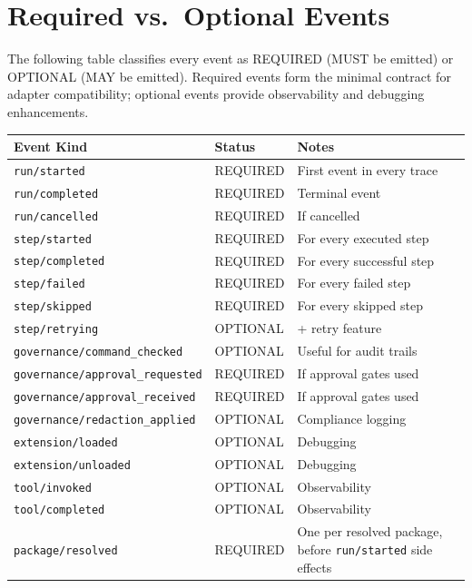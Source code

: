 \section{Required vs.\ Optional Events}

The following table classifies every event as REQUIRED (MUST be emitted) or OPTIONAL (MAY be emitted). Required events form the minimal contract for adapter compatibility; optional events provide observability and debugging enhancements.

\begin{center}
\small
\begin{tabular}{llp{6cm}}
\textbf{Event Kind} & \textbf{Status} & \textbf{Notes} \\
\hline
\texttt{run/started} & REQUIRED & First event in every trace \\
\texttt{run/completed} & REQUIRED & Terminal event \\
\texttt{run/cancelled} & REQUIRED & If cancelled \\
\texttt{step/started} & REQUIRED & For every executed step \\
\texttt{step/completed} & REQUIRED & For every successful step \\
\texttt{step/failed} & REQUIRED & For every failed step \\
\texttt{step/skipped} & REQUIRED & For every skipped step \\
\texttt{step/retrying} & OPTIONAL & + retry feature \\
\texttt{governance/command\_checked} & OPTIONAL & Useful for audit trails \\
\texttt{governance/approval\_requested} & REQUIRED & If approval gates used \\
\texttt{governance/approval\_received} & REQUIRED & If approval gates used \\
\texttt{governance/redaction\_applied} & OPTIONAL & Compliance logging \\
\texttt{extension/loaded} & OPTIONAL & Debugging \\
\texttt{extension/unloaded} & OPTIONAL & Debugging \\
\texttt{tool/invoked} & OPTIONAL & Observability \\
\texttt{tool/completed} & OPTIONAL & Observability \\
\texttt{package/resolved} & REQUIRED & One per resolved package, before \texttt{run/started} side effects \\

\end{tabular}
\end{center}
